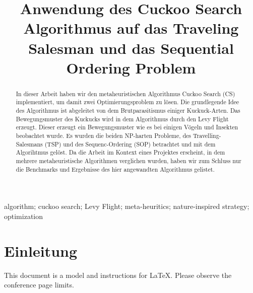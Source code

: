 \documentclass[conference]{IEEEtran}
\begin{document}
  \title{Anwendung des Cuckoo Search Algorithmus auf das Traveling Salesman und das Sequential Ordering Problem}

  \author{
    \and
  }

  \maketitle

  \begin{abstract}
    In dieser Arbeit haben wir den metaheuristischen Algorithmus Cuckoo Search (CS) implementiert, 
    um damit zwei Optimierungsproblem zu lösen. Die grundlegende Idee des Algorithmus ist abgeleitet 
    von dem Brutparasitismus einiger Kuckuck-Arten. Das Bewegungsmuster des Kuckucks wird in dem 
    Algorithmus durch den Levy Flight erzeugt. Dieser erzeugt ein Bewegungsmuster wie es bei einigen 
    Vögeln und Insekten beobachtet wurde.  Es wurden die beiden NP-harten Probleme, des 
    Travelling-Salesmans (TSP) und des Sequenc-Ordering (SOP) betrachtet und mit dem Algorihtmus 
    gelöst. Da die Arbeit im Kontext eines Projektes erscheint, in dem mehrere metaheuristische 
    Algorithmen verglichen wurden, haben wir zum Schluss nur die Benchmarks und Ergebnisse des 
    hier angewandten Algorithmus gelistet.
  \end{abstract}

  \begin{IEEEkeywords}
    algorithm; cuckoo search; Levy Flight; meta-heuritics; nature-inspired strategy; optimization
  \end{IEEEkeywords}

  \section{Einleitung}
    This document is a model and instructions for \LaTeX.
    Please observe the conference page limits. 
\end{document}

